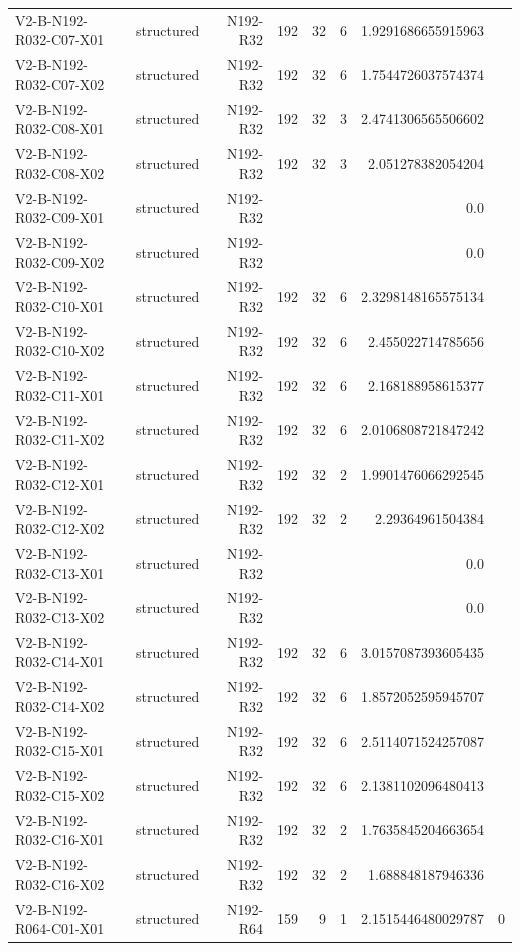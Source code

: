 {\begin{longtable}{lrrrrrrr}
V2-B-N192-R032-C07-X01 & structured & N192-R32 & 192 & 32 & 6 & 1.9291686655915963 &  \\
V2-B-N192-R032-C07-X02 & structured & N192-R32 & 192 & 32 & 6 & 1.7544726037574374 &  \\
V2-B-N192-R032-C08-X01 & structured & N192-R32 & 192 & 32 & 3 & 2.4741306565506602 &  \\
V2-B-N192-R032-C08-X02 & structured & N192-R32 & 192 & 32 & 3 & 2.051278382054204 &  \\
V2-B-N192-R032-C09-X01 & structured & N192-R32 &  &  &  & 0.0 &  \\
V2-B-N192-R032-C09-X02 & structured & N192-R32 &  &  &  & 0.0 &  \\
V2-B-N192-R032-C10-X01 & structured & N192-R32 & 192 & 32 & 6 & 2.3298148165575134 &  \\
V2-B-N192-R032-C10-X02 & structured & N192-R32 & 192 & 32 & 6 & 2.455022714785656 &  \\
V2-B-N192-R032-C11-X01 & structured & N192-R32 & 192 & 32 & 6 & 2.168188958615377 &  \\
V2-B-N192-R032-C11-X02 & structured & N192-R32 & 192 & 32 & 6 & 2.0106808721847242 &  \\
V2-B-N192-R032-C12-X01 & structured & N192-R32 & 192 & 32 & 2 & 1.9901476066292545 &  \\
V2-B-N192-R032-C12-X02 & structured & N192-R32 & 192 & 32 & 2 & 2.29364961504384 &  \\
V2-B-N192-R032-C13-X01 & structured & N192-R32 &  &  &  & 0.0 &  \\
V2-B-N192-R032-C13-X02 & structured & N192-R32 &  &  &  & 0.0 &  \\
V2-B-N192-R032-C14-X01 & structured & N192-R32 & 192 & 32 & 6 & 3.0157087393605435 &  \\
V2-B-N192-R032-C14-X02 & structured & N192-R32 & 192 & 32 & 6 & 1.8572052595945707 &  \\
V2-B-N192-R032-C15-X01 & structured & N192-R32 & 192 & 32 & 6 & 2.5114071524257087 &  \\
V2-B-N192-R032-C15-X02 & structured & N192-R32 & 192 & 32 & 6 & 2.1381102096480413 &  \\
V2-B-N192-R032-C16-X01 & structured & N192-R32 & 192 & 32 & 2 & 1.7635845204663654 &  \\
V2-B-N192-R032-C16-X02 & structured & N192-R32 & 192 & 32 & 2 & 1.688848187946336 &  \\
V2-B-N192-R064-C01-X01 & structured & N192-R64 & 159 & 9 & 1 & 2.1515446480029787 & 0 \\

\end{longtable}}
